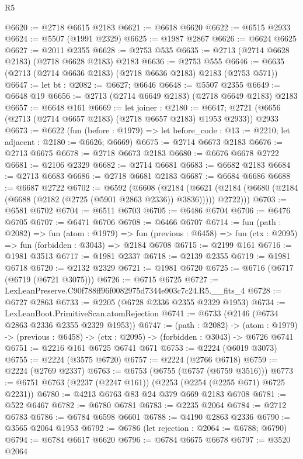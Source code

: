\begin{lexlean}{R5}
\begin{coremodule}
@6620 := @2718 @6615 @2183
@6621 := @6618 @6620
@6622 := @6515 @2933
@6624 := @5507 (@1991 @2329)
@6625 := @1987 @2867
@6626 := @6624 @6625
@6627 := @2011 @2355
@6628 := @2753 @535
@6635 := @2713 (@2714 @6628 @2183) (@2718 @6628 @2183) @2183
@6636 := @2753 @555
@6646 := @6635 (@2713 (@2714 @6636 @2183) (@2718 @6636 @2183) @2183 (@2753 @571))
@6647 := let bt : @2082 := @6627; @6646
@6648 := @5507 @2355
@6649 := @6648 @19
@6656 := @2713 (@2714 @6649 @2183) (@2718 @6649 @2183) @2183
@6657 := @6648 @161
@6669 := let joiner : @2180 := @6647;
  @2721 (@6656 (@2713 (@2714 @6657 @2183) (@2718 @6657 @2183) @1953 @2933)) @2933
@6673 := @6622
    (fun (before : @1979) => let before_code : @13 := @2210; let adjacent : @2180 := @6626; @6669)
@6675 := @2714 @6673 @2183
@6676 := @2713 @6675
@6678 := @2718 @6673 @2183
@6680 := @6676 @6678 @2722
@6681 := @2106 @2329
@6682 := @2714 @6681
@6683 := @6682 @2183
@6684 := @2713 @6683
@6686 := @2718 @6681 @2183
@6687 := @6684 @6686
@6688 := @6687 @2722
@6702 := @6592
    (@6608
      (@2184
        (@6621 (@2184 (@6680 (@2184 (@6688 (@2182 (@2725 (@5901 @2863 @2336)) @3836))))) @2722)))
@6703 := @6581 @6702
@6704 := @6511 @6703
@6705 := @6486 @6704
@6706 := @6476 @6705
@6707 := @6471 @6706
@6708 := @6466 @6707
@6714 := fun (path : @2082) =>
  fun (atom : @1979) =>
  fun (previous : @6458) => fun (ctx : @2095) => fun (forbidden : @3043) => @2184 @6708
@6715 := @2199 @161
@6716 := @1981 @3513
@6717 := @1981 @2337
@6718 := @2139 @2355
@6719 := @1981 @6718
@6720 := @2132 @2329
@6721 := @1981 @6720
@6725 := @6716 (@6717 (@6719 (@6721 @3075)))
@6726 := @6715 @6725
@6727 := LexLeanPreserve.C90f788ff96f0082975d7344e903c7c24.R5.__fits_4
@6728 := @6727 @2863
@6733 := @2205 (@6728 @2336 @2355 @2329 @1953)
@6734 := LexLeanBoot.PrimitiveScan.atomRejection
@6741 := @6733 (@2146 (@6734 @2863 @2336 @2355 @2329 @1953))
@6747 := (path : @2082) ->
  (atom : @1979) -> (previous : @6458) -> (ctx : @2095) -> (forbidden : @3043) -> @6726 @6741
@6751 := @2216 @161 @6725 @6741 @671
@6753 := @2224 (@6019 @3073)
@6755 := @2224 (@3575 @6720)
@6757 := @2224 (@2766 @6718)
@6759 := @2224 (@2769 @2337)
@6763 := @6753 (@6755 (@6757 (@6759 @3516)))
@6773 := @6751 @6763 (@2237 (@2247 @161)) (@2253 (@2254 (@2255 @671) @6725 @2231))
@6780 := @4213 @6763 @83 @24 @379 @669 @2183 @6708
@6781 := @522 @6467
@6782 := @6780 @6781
@6783 := @2235 @2064
@6784 := @2712 @6783
@6786 := @6784 @6598 @6601
@6788 := @4190 @2863 @2336
@6790 := @3565 @2064 @1953
@6792 := @6786 (let rejection : @2064 := @6788; @6790)
@6794 := @6784 @6617 @6620
@6796 := @6784 @6675 @6678
@6797 := @3520 @2064

\end{coremodule}
\end{lexlean}
